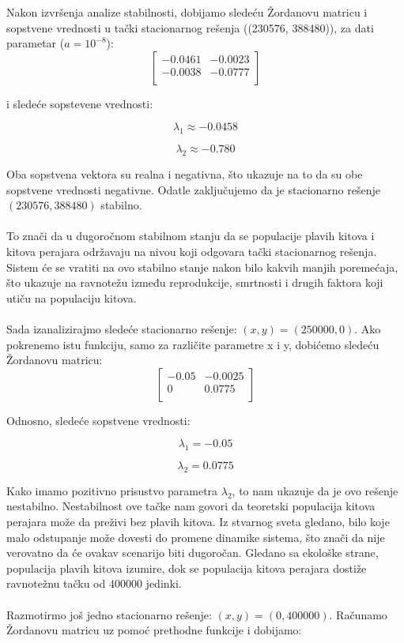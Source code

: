\documentclass[a4paper]{article}
\begin{document}
{	
	Nakon izvršenja analize stabilnosti, dobijamo sledeću Žordanovu matricu i sopstvene vrednosti u tački stacionarnog rešenja ((230576, 388480)), za dati parametar ($a = 10^{-8}$):
	\[
		\begin{bmatrix}
			-0.0461 & -0.0023 \\
			-0.0038 & -0.0777 \\
		\end{bmatrix} 
	\]	
	
	i sledeće sopstevene vrednosti:
	
	\[
		\lambda_1 \approx -0.0458
	\]
	
	\[
		\lambda_2 \approx -0.780
	\]
	
	Oba sopstvena vektora su realna i negativna, što ukazuje na to da su obe sopstvene vrednosti negativne. Odatle zaključujemo da je stacionarno rešenje $(230576, 388480)$ stabilno. \\
	\\ 
	To znači da u dugoročnom stabilnom stanju da se populacije plavih kitova i kitova perajara održavaju na nivou koji odgovara tački stacionarnog rešenja. Sistem će se vratiti na ovo stabilno stanje nakon bilo kakvih manjih poremećaja, što ukazuje na ravnotežu između reprodukcije, smrtnosti i drugih faktora koji utiču na populaciju kitova. \\
	\\
	Sada izanalizirajmo sledeće stacionarno rešenje: $(x, y) = (250000, 0)$. Ako pokrenemo istu funkciju, samo za različite parametre x i y, dobićemo sledeću Žordanovu matricu:\\
	
	\[
		\begin{bmatrix}
			-0.05 & -0.0025 \\
			    0   & 0.0775 \\
		\end{bmatrix} 
	\]
	
	Odnosno, sledeće sopstvene vrednosti:
	
	\[
		\lambda_1 = -0.05
	\] 
	
	\[
		\lambda_2 = 0.0775
	\]
	
	Kako imamo pozitivno prisustvo parametra $\lambda_2$, to nam ukazuje da je ovo rešenje nestabilno. Nestabilnost ove tačke nam govori da teoretski populacija kitova perajara može da preživi bez plavih kitova. Iz stvarnog sveta gledano, bilo koje malo odstupanje može dovesti do promene dinamike sistema, što znači da nije verovatno da će ovakav scenarijo biti dugoročan. Gledano sa ekološke strane, populacija plavih kitova izumire, dok se populacija kitova perajara dostiže ravnotežnu tačku od 400000 jedinki. \\
	\\
	Razmotirmo još jedno stacionarno rešenje: $(x, y) = (0, 400000)$. Računamo Žordanovu matricu uz pomoć prethodne funkcije i dobijamo:
	
}
\end{document}
